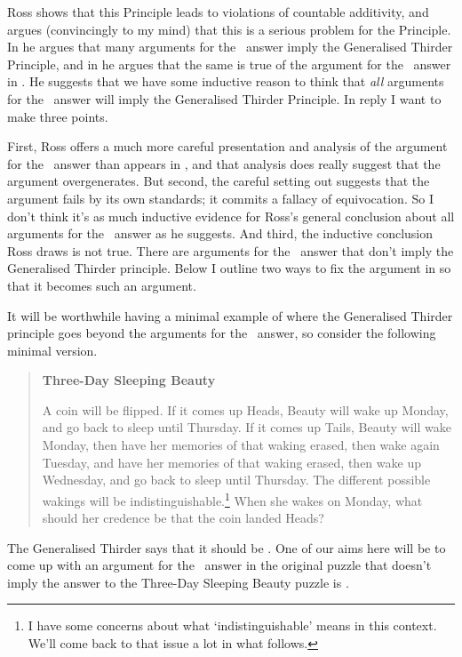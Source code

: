 \noindent Ross shows that this Principle leads to violations of countable additivity, and argues (convincingly to my mind) that this is a serious problem for the Principle. In \citet{Ross2010} he argues that many arguments for the \third\ answer imply the Generalised Thirder Principle, and in \citet{Ross2012} he argues that the same is true of the argument for the \third\ answer in \citet{Weatherson-SoSB}. He suggests that we have some inductive reason to think that \textit{all} arguments for the \third\ answer will imply the Generalised Thirder Principle. In reply I want to make three points.

First, Ross offers a much more careful presentation and analysis of the argument for the \third\ answer than appears in \citet{Weatherson-SoSB}, and that analysis does really suggest that the argument overgenerates. But second, the careful setting out suggests that the argument fails by its own standards; it commits a fallacy of equivocation. So I don't think it's as much inductive evidence for Ross's general conclusion about all arguments for the \third\ answer as he suggests. And third, the inductive conclusion Ross draws is not true. There are arguments for the \third\ answer that don't imply the Generalised Thirder principle. Below I outline two ways to fix the argument in \citet{Weatherson-SoSB} so that it becomes such an argument. 

It will be worthwhile having a minimal example of where the Generalised Thirder principle goes beyond the arguments for the \third\ answer, so consider the following minimal version.

\begin{quote}
\textbf{Three-Day Sleeping Beauty}

A coin will be flipped. If it comes up Heads, Beauty will wake up Monday, and go back to sleep until Thursday. If it comes up Tails, Beauty will wake Monday, then have her memories of that waking erased, then wake again Tuesday, and have her memories of that waking erased, then wake up Wednesday, and go back to sleep until Thursday. The different possible wakings will be indistinguishable.\footnote{I have some concerns about what `indistinguishable' means in this context. We'll come back to that issue a lot in what follows.} When she wakes on Monday, what should her credence be that the coin landed Heads?
\end{quote}

\noindent The Generalised Thirder says that it should be \quarter. One of our aims here will be to come up with an argument for the \third\ answer in the original puzzle that doesn't imply the answer to the Three-Day Sleeping Beauty puzzle is \quarter.

